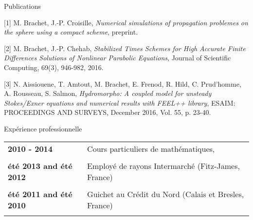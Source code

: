\documentclass[10pt,a4paper]{report}
\begin{document}
\newpage
\noindent
{\selectfont
\begin{Large}
Publications
\end{Large}
\hrulefill
}

\vspace{0.6cm}

[1] {\sc  M. Brachet, J.-P. Croisille}, {\sl Numerical simulations of propagation problemes on the sphere using a compact scheme}, preprint.

\vspace{0.6cm}

[2] {\sc M. Brachet, J.-P. Chehab}, {\sl Stabilized Times Schemes for High Accurate Finite Differences Solutions of Nonlinear Parabolic Equations}, Journal of Scientific Computing, 69(3), 946-982, 2016.

\vspace{0.6cm}

[3] {\sc  N. Aissiouene, T. Amtout, M. Brachet, E. Frenod, R. Hild, C. Prud'homme, A. Rousseau, S. Salmon}, {\sl  Hydromorpho: A coupled model for unsteady Stokes/Exner equations and numerical results with FEEL++ library}, ESAIM: PROCEEDINGS AND SURVEYS, December 2016, Vol. 55, p. 23-40.






\vspace{1cm}
\noindent
{\selectfont
\begin{Large}
Expérience professionnelle
\end{Large}
\hrulefill
}

\vspace{0.6cm}
\noindent
\begin{center}
\begin{tabular}{p{5cm} p{10cm}}
\textbf{2010 - 2014} & Cours particuliers de mathématiques,\\

& \\

\textbf{été 2013 and été 2012} & Employé de rayons Intermarché (Fitz-James, France) \\

& \\

\textbf{été 2011 and été 2010} & Guichet au Crédit du Nord (Calais et Bresles, France) \\

& \\

\end{tabular}
\end{center}
\end{document}
